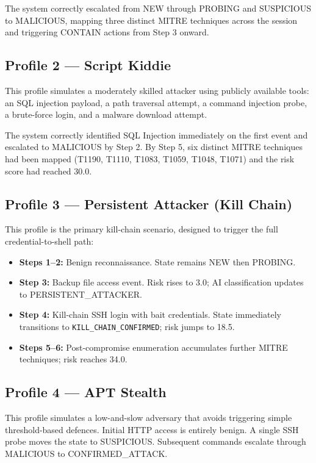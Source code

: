 The system correctly escalated from NEW through PROBING and SUSPICIOUS to MALICIOUS, mapping three distinct MITRE techniques across the session and triggering CONTAIN actions from Step 3 onward.

\subsection{Profile 2 — Script Kiddie}

This profile simulates a moderately skilled attacker using publicly available tools: an \ac{SQL} injection payload, a path traversal attempt, a command injection probe, a brute-force login, and a malware download attempt.

The system correctly identified SQL Injection immediately on the first event and escalated to MALICIOUS by Step 2. By Step 5, six distinct MITRE techniques had been mapped (T1190, T1110, T1083, T1059, T1048, T1071) and the risk score had reached 30.0.

\subsection{Profile 3 — Persistent Attacker (Kill Chain)}

This profile is the primary kill-chain scenario, designed to trigger the full credential-to-shell path:

\begin{itemize}
    \item \textbf{Steps 1–2:} Benign reconnaissance. State remains NEW then PROBING.
    \item \textbf{Step 3:} Backup file access event. Risk rises to 3.0; AI classification updates to PERSISTENT\_ATTACKER.
    \item \textbf{Step 4:} Kill-chain \ac{SSH} login with bait credentials. State immediately transitions to \texttt{KILL\_CHAIN\_CONFIRMED}; risk jumps to 18.5.
    \item \textbf{Steps 5–6:} Post-compromise enumeration accumulates further MITRE techniques; risk reaches 34.0.
\end{itemize}

\subsection{Profile 4 — APT Stealth}

This profile simulates a low-and-slow adversary that avoids triggering simple threshold-based defences. Initial \ac{HTTP} access is entirely benign. A single \ac{SSH} probe moves the state to SUSPICIOUS. Subsequent commands escalate through MALICIOUS to CONFIRMED\_ATTACK.

